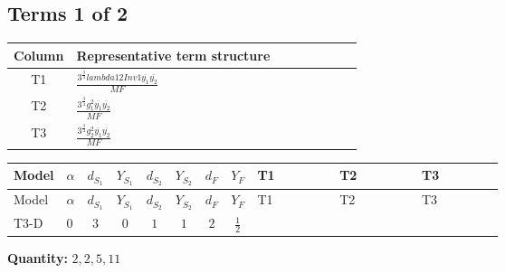 \documentclass[8pt]{article}
\begin{document}
\begin{landscape}
\subsection*{Terms 1 of 2}
\begin{center}
\begin{tabular}{@{}c >{\raggedright\arraybackslash}p{0.82\linewidth}@{}}
\toprule
Column & Representative term structure \\
\midrule
T1 & \(\displaystyle \frac{3^{\frac{3}{4}} lambda12Inv1 \overline{y_{1}} \overline{y_{2}}}{MF}\) \\
\midrule
T2 & \(\displaystyle \frac{3^{\frac{3}{4}} g_{1}^{2} \overline{y_{1}} \overline{y_{2}}}{MF}\) \\
\midrule
T3 & \(\displaystyle \frac{3^{\frac{3}{4}} g_{2}^{2} \overline{y_{1}} \overline{y_{2}}}{MF}\) \\
\midrule
\bottomrule
\end{tabular}
\end{center}
\smallskip
\tiny
\begin{longtable}{@{}llcccccc >{\raggedright\arraybackslash}p{0.21\linewidth} >{\raggedright\arraybackslash}p{0.21\linewidth} >{\raggedright\arraybackslash}p{0.21\linewidth}@{}}
\toprule
Model & $\alpha$ & $d_{S_1}$ & $Y_{S_1}$ & $d_{S_2}$ & $Y_{S_2}$ & $d_F$ & $Y_F$ & T1 & T2 & T3 \\
\midrule
\endfirsthead
\toprule
Model & $\alpha$ & $d_{S_1}$ & $Y_{S_1}$ & $d_{S_2}$ & $Y_{S_2}$ & $d_F$ & $Y_F$ & T1 & T2 & T3 \\
\midrule
\endhead
T3-D & $0$ & $3$ & $0$ & $1$ & $1$ & $2$ & $\frac{1}{2}$ & \scriptsize\adjustbox{max width=\linewidth}{$\begin{gathered} \frac{3^{\frac{3}{4}} lambda12Inv1 \overline{y_{1}} \overline{y_{2}}}{6 MF}\end{gathered}$} & \scriptsize\adjustbox{max width=\linewidth}{$\begin{gathered} \frac{3^{\frac{3}{4}} g_{1}^{2} \overline{y_{1}} \overline{y_{2}}}{8 MF}\end{gathered}$} & \scriptsize\adjustbox{max width=\linewidth}{$\begin{gathered} \frac{11 \cdot 3^{\frac{3}{4}} g_{2}^{2} \overline{y_{1}} \overline{y_{2}}}{8 MF}\end{gathered}$} \\
\midrule
\bottomrule
\end{longtable}
\clearpage
\noindent\textbf{Quantity: }$\mathrm{2,2,5,11}$\par\smallskip

\end{landscape}
\end{document}
